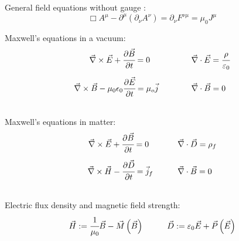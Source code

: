 		General field equations without gauge :
		\begin{equation}
			\Box A^\mu-\partial^\mu\left(\partial_\nu A^\nu\right) = \partial_\nu F^{\nu\mu} =  \mu_0 J^\mu
		\end{equation}

		\noindent
		Maxwell's equations in a vacuum:
		\begin{equation}
		\begin{array}{rl}
			\vec{\nabla}\times \vec{E} + \cfrac{\partial\vec{B}}{\partial t} = 0 \phantom{\mu_0}
			&\hspace{30pt} \vec{\nabla}\cdot\vec{E} = \cfrac{\rho}{\varepsilon_0} \\ \xrowht{40pt}
			\vec{\nabla}\times\vec{B} - \mu_0 \epsilon_0 \cfrac{\partial \vec{E}}{\partial t} = \mu_o\vec{j}
			&\hspace{30pt} \vec{\nabla}\cdot\vec{B} = 0 \\
		\end{array}
		\end{equation}

		\noindent
		Maxwell's equations in matter:
		\begin{equation}
		\begin{array}{rl}
			\vec{\nabla}\times \vec{E} + \cfrac{\partial\vec{B}}{\partial t} = 0 \phantom{_f}
			&\hspace{20pt} \vec{\nabla}\cdot\vec{D} = \rho_f\\ \xrowht{40pt}
			\vec{\nabla}\times\vec{H} - \cfrac{\partial \vec{D}}{\partial t} = \vec{j}_f
			&\hspace{20pt} \vec{\nabla}\cdot\vec{B} = 0 \\
		\end{array}
		\end{equation}

		\noindent
		Electric flux density and magnetic field strength:
		\begin{equation} \label{Eq:FluxDensityFieldStrength}
		\begin{array}{cc}
			\vec{H} := \cfrac{1}{\mu_0}\Vec{B} - \vec{M}\left(\vec{B}\right)
			&\hspace{20pt} \vec{D} := \varepsilon_0\vec{E} + \vec{P}\left(\vec{E}\right)
		\end{array}
		\end{equation}


